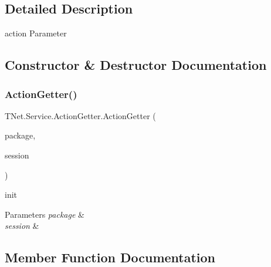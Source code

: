 \subsection{Detailed Description}
action Parameter 



\subsection{Constructor \& Destructor Documentation}
\mbox{\label{class_t_net_1_1_service_1_1_action_getter_a7b3352e652569624636f868760a6ff5d}} 
\subsubsection{\texorpdfstring{Action\+Getter()}{ActionGetter()}}
{\footnotesize\ttfamily T\+Net.\+Service.\+Action\+Getter.\+Action\+Getter (\begin{DoxyParamCaption}\item[{\mbox{\hyperlink{class_t_net_1_1_contract_1_1_request_package}{Request\+Package}}}]{package,  }\item[{\mbox{\hyperlink{class_t_net_1_1_contract_1_1_game_session}{Game\+Session}}}]{session }\end{DoxyParamCaption})}



init 


\begin{DoxyParams}{Parameters}
{\em package} & \\
\hline
{\em session} & \\
\hline
\end{DoxyParams}


\subsection{Member Function Documentation}
\mbox{\label{class_t_net_1_1_service_1_1_action_getter_afd79de3801d7a69f32ba85c62f45a774}} 
